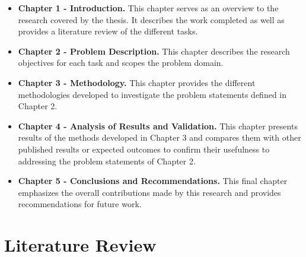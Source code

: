 \begin{itemize}

\item \textbf{Chapter 1 - Introduction.} This chapter serves as an overview to the research covered by the thesis. It describes the work completed as well as provides a literature review of the different tasks.

\item \textbf{Chapter 2 - Problem Description.} This chapter describes the research objectives for each task and scopes the problem domain.

\item \textbf{Chapter 3 - Methodology.} This chapter provides the different methodologies developed to investigate the problem statements defined in Chapter 2.

\item \textbf{Chapter 4 - Analysis of Results and Validation.} This chapter presents results of the methods developed in Chapter 3 and compares them with other published results or expected outcomes to confirm their usefulness to addressing the problem statements of Chapter 2.

\item \textbf{Chapter 5 - Conclusions and Recommendations.} This final chapter emphasizes the overall contributions made by this research and provides recommendations for future work.

\end{itemize}
\section{Literature Review}

